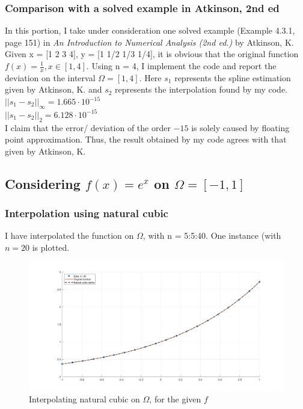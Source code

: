 \documentclass[12pt]{article}
\begin{document}
\subsubsection{Comparison with a solved example in Atkinson, 2nd ed}
In this portion, I take under consideration one solved example (Example 4.3.1, page 151) in \emph{An Introduction to Numerical Analysis (2nd ed.)} by Atkinson, K.\\
Given {\selectfont x = [1 2 3 4], y = [1 1/2 1/3 1/4]}, it is obvious that the original function $f(x) = \frac{1}{x}, x \in [1,4]$. Using {\selectfont n = 4}, I implement the code and report the deviation on the interval $\Omega = [1,4]$. Here $s_1$ represents the spline estimation given by Atkinson, K. and $s_2$ represents the interpolation found by my code.\\
$||s_1-s_2||_\infty = 1.665 \cdot 10^{-15}$\\
$||s_1-s_2||_2 = 6.128 \cdot 10^{-15}$\\
I claim that the error/ deviation of the order $-15$ is solely caused by floating point approximation. Thus, the result obtained by my code agrees with that given by Atkinson, K.

\subsection{Considering $f(x) = e^x$ on $\Omega = [-1, 1]$}
\subsubsection{Interpolation using natural cubic}
I have interpolated the function on $\Omega$, with {\selectfont n = 5:5:40}. One instance (with $n = 20$ is plotted.
\begin{figure}[h]
    \centering
    \includegraphics[scale = 0.25]{nat_cub_20.png}
    \caption{Interpolating natural cubic on $\Omega$, for the given $f$}
    \label{fig:my_label}
\end{figure}
\end{document}
